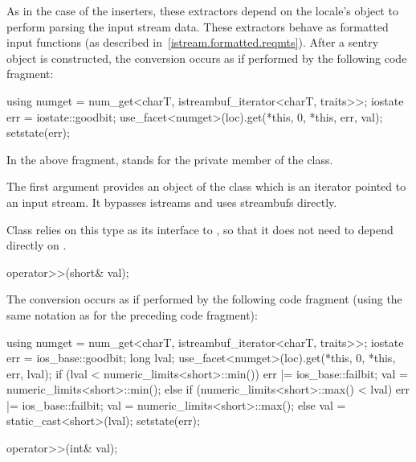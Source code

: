 \begin{itemdescr}
\pnum
As in the case of the inserters, these extractors depend on the
locale's
 object to perform parsing the input
stream data.
These extractors behave as formatted input functions (as described in~\ref{istream.formatted.reqmts}).  After a sentry object is constructed, the
conversion occurs as if performed by the following code fragment:
\begin{codeblock}
using numget = num_get<charT, istreambuf_iterator<charT, traits>>;
iostate err = iostate::goodbit;
use_facet<numget>(loc).get(*this, 0, *this, err, val);
setstate(err);
\end{codeblock}
In the above fragment,
stands for the private member of the
class.
\begin{note}
The first argument provides an object of the
class which is an iterator pointed to an input stream.
It bypasses istreams and uses streambufs directly.
\end{note}
Class
relies on this
type as its interface to
,
so that it does not need to depend directly on
.
\end{itemdescr}

%
\begin{itemdecl}
operator>>(short& val);
\end{itemdecl}

\begin{itemdescr}
\pnum
The conversion occurs as if performed by the following code fragment
(using the same notation as for the preceding code fragment):
\begin{codeblock}
using numget = num_get<charT, istreambuf_iterator<charT, traits>>;
iostate err = ios_base::goodbit;
long lval;
use_facet<numget>(loc).get(*this, 0, *this, err, lval);
if (lval < numeric_limits<short>::min()) {
  err |= ios_base::failbit;
  val = numeric_limits<short>::min();
} else if (numeric_limits<short>::max() < lval) {
  err |= ios_base::failbit;
  val = numeric_limits<short>::max();
}  else
  val = static_cast<short>(lval);
setstate(err);
\end{codeblock}
\end{itemdescr}

%
\begin{itemdecl}
operator>>(int& val);
\end{itemdecl}

